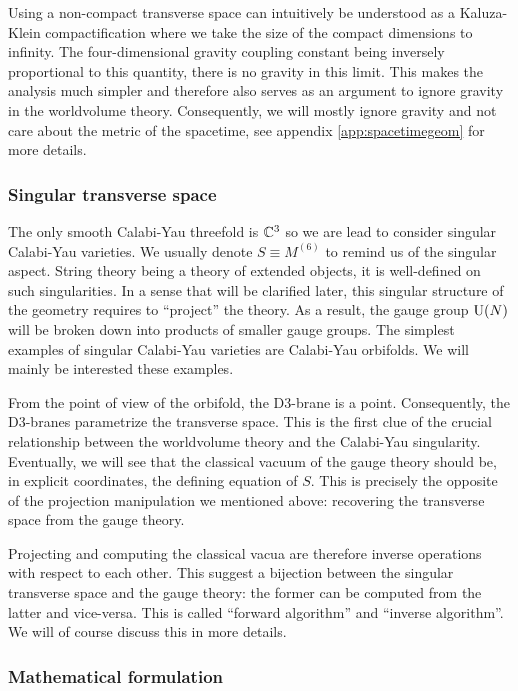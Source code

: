        Using a non-compact transverse space can intuitively be understood as a Kaluza-Klein compactification where we take the size of the compact dimensions to infinity. The four-dimensional gravity coupling constant being inversely proportional to this quantity, there is no gravity in this limit. This makes the analysis much simpler and therefore also serves as an argument to ignore gravity in the worldvolume theory. Consequently, we will mostly ignore gravity and not care about the metric of the spacetime, see appendix \ref{app:spacetimegeom} for more details.

    \subsubsection*{Singular transverse space}

        The only smooth Calabi-Yau threefold is $\mathbb{C}^3$ so we are lead to consider singular Calabi-Yau varieties. We usually denote $S\equiv M^{(6)}$ to remind us of the singular aspect. String theory being a theory of extended objects, it is well-defined on such singularities. In a sense that will be clarified later, this singular structure of the geometry requires to ``project'' the theory. As a result, the gauge group $\text{U}(N)$ will be broken down into products of smaller gauge groups. The simplest examples of singular Calabi-Yau varieties are Calabi-Yau orbifolds. We will mainly be interested these examples.
    
        From the point of view of the orbifold, the D$3$-brane is a point. Consequently, the D$3$-branes parametrize the transverse space. This is the first clue of the crucial relationship between the worldvolume theory and the Calabi-Yau singularity. Eventually, we will see that the classical vacuum of the gauge theory should be, in explicit coordinates, the defining equation of $S$. This is precisely the opposite of the projection manipulation we mentioned above: recovering the transverse space from the gauge theory. 
        
        Projecting and computing the classical vacua are therefore inverse operations with respect to each other. This suggest a bijection between the singular transverse space and the gauge theory: the former can be computed from the latter and vice-versa. This is called ``forward algorithm'' and ``inverse algorithm''. We will of course discuss this in more details.

    \subsubsection*{Mathematical formulation}

